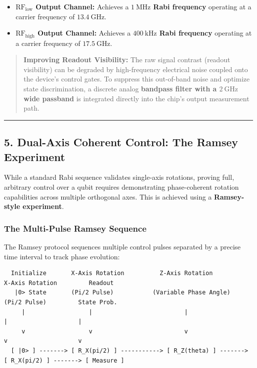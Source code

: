 \documentclass[
]{article}
\providecommand{\tightlist}{%
  \setlength{\itemsep}{0pt}\setlength{\parskip}{0pt}}
\begin{document}
\begin{itemize}
\tightlist
\item
  \textbf{\(\text{RF}_{\text{low}}\) Output Channel:} Achieves a
  \textbf{\(1\ \text{MHz}\) Rabi frequency} operating at a carrier
  frequency of \textbf{\(13.4\ \text{GHz}\)}.
\item
  \textbf{\(\text{RF}_{\text{high}}\) Output Channel:} Achieves a
  \textbf{\(400\ \text{kHz}\) Rabi frequency} operating at a carrier
  frequency of \textbf{\(17.5\ \text{GHz}\)}.
\end{itemize}

\begin{quote}
\textbf{Improving Readout Visibility:} The raw signal contrast (readout
visibility) can be degraded by high-frequency electrical noise coupled
onto the device's control gates. To suppress this out-of-band noise and
optimize state discrimination, a discrete analog \textbf{bandpass filter
with a \(2\ \text{GHz}\) wide passband} is integrated directly into the
chip's output measurement path.
\end{quote}

\begin{center}\rule{0.5\linewidth}{0.5pt}\end{center}

\subsection{5. Dual-Axis Coherent Control: The Ramsey
Experiment}\label{dual-axis-coherent-control-the-ramsey-experiment}

While a standard Rabi sequence validates single-axis rotations, proving
full, arbitrary control over a qubit requires demonstrating
phase-coherent rotation capabilities across multiple orthogonal axes.
This is achieved using a \textbf{Ramsey-style experiment}.

\subsubsection{The Multi-Pulse Ramsey
Sequence}\label{the-multi-pulse-ramsey-sequence}

The Ramsey protocol sequences multiple control pulses separated by a
precise time interval to track phase evolution:

\begin{verbatim}
  Initialize       X-Axis Rotation          Z-Axis Rotation          X-Axis Rotation         Readout
   |0> State       (Pi/2 Pulse)           (Variable Phase Angle)      (Pi/2 Pulse)         State Prob.
     |                  |                          |                       |                    |
     v                  v                          v                       v                    v
  [ |0> ] -------> [ R_X(pi/2) ] -----------> [ R_Z(theta) ] -------> [ R_X(pi/2) ] -------> [ Measure ]
\end{verbatim}
\end{document}
